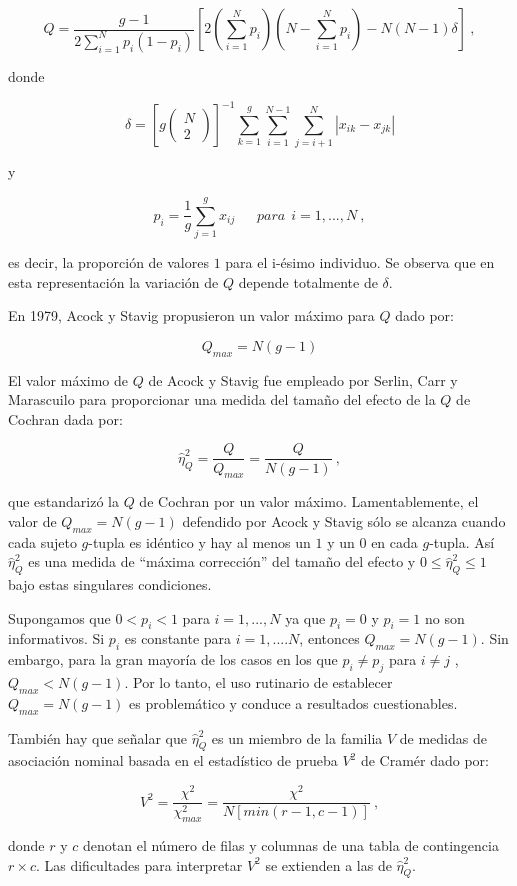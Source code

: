 \documentclass[12pt,a4paper,]{book}
\numberwithin{dummy}{section}
\theoremstyle{ocrenumbox}
\theoremstyle{blacknumex}
\theoremstyle{blacknumbox}
\theoremstyle{ocrenum}
\theoremstyle{ocrenum}
\begin{document}
\[
Q=\frac{g-1}{2\displaystyle\sum_{i=1}^Np_i(1-p_i)}[2(\sum_{i=1}^Np_i)(N-\sum_{i=1}^Np_i)-N(N-1)\delta]~,
\]

donde

\[
\delta=[g\left(\begin{array}{c}N\\ 2\end{array}\right)]^{-1}\sum_{k=1}^g\sum_{i=1}^{N-1}\sum_{j=i+1}^N|x_{ik}-x_{jk}|
\]

y

\[
p_i=\frac{1}{g}\sum_{j=1}^gx_{ij} ~~~~~~~para~~ i=1,...,N~,
\]

es decir, la proporción de valores \(1\) para el i-ésimo individuo. Se
observa que en esta representación la variación de \(Q\) depende
totalmente de \(\delta\).

En 1979, Acock y Stavig \citep{Acock1979}propusieron un valor máximo
para \(Q\) dado por:

\[
Q_{max}=N(g-1)
\]

El valor máximo de \(Q\) de Acock y Stavig fue empleado por Serlin, Carr
y Marascuilo \citep{Serlin1982} para proporcionar una medida del tamaño
del efecto de la \(Q\) de Cochran dada por:

\[
\hat\eta_Q^2=\frac{Q}{Q_{max}}=\frac{Q}{N(g-1)}~,
\]

que estandarizó la \(Q\) de Cochran por un valor máximo.
Lamentablemente, el valor de \(Q_{max} = N(g - 1)\) defendido por Acock
y Stavig sólo se alcanza cuando cada sujeto \(g\)-tupla es idéntico y
hay al menos un \(1\) y un \(0\) en cada \(g\)-tupla. Así
\(\hat\eta_Q^2\) es una medida de ``máxima corrección'' del tamaño del
efecto y \(0 \le \hat\eta_Q^2\le 1\) bajo estas singulares condiciones.

Supongamos que \(0 < p_i < 1\) para \(i = 1, . . . , N\) ya que
\(p_i = 0\) y \(p_i = 1\) no son informativos. Si \(p_i\) es constante
para \(i = 1, . . . . N\), entonces \(Q_{max} = N(g-1)\). Sin embargo,
para la gran mayoría de los casos en los que \(p_i \ne p_j\) para
\(i\ne j\) , \(Q_{max} < N(g -1)\). Por lo tanto, el uso rutinario de
establecer \(Q_{max} = N(g - 1)\) es problemático y conduce a resultados
cuestionables.

También hay que señalar que \(\hat\eta_Q^2\) es un miembro de la familia
\(V\) de medidas de asociación nominal basada en el estadístico de
prueba \(V^2\) de Cramér dado por:

\[
V^2=\frac{\chi^2}{\chi_{max}^2}=\frac{\chi^2}{N[min(r-1,c-1)]}~,
\]

donde \(r\) y \(c\) denotan el número de filas y columnas de una tabla
de contingencia \(r\times c\). Las dificultades para interpretar \(V^2\)
se extienden a las de \(\hat\eta_Q^2\).
\end{document}
